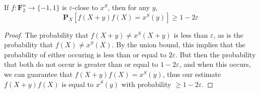 \begin{theorem}
    If $f: \mathbf{F}_2^n \to \{ -1, 1 \}$ is $\varepsilon$-close to $x^S$, then for any $y$,
    \[ \mathbf{P}_X[f(X + y)f(X) = x^S(y)] \geq 1 - 2 \varepsilon \]
\end{theorem}
\begin{proof}
    The probability that $f(X + y) \neq x^S(X + y)$ is less than $\varepsilon$, as is the probability that $f(X) \neq x^S(X)$. By the union bound, this implies that the probability of either occuring is less than or equal to $2\varepsilon$. But then the probability that both do not occur is greater than or equal to $1 - 2\varepsilon$, and when this occurs, we can guarantee that $f(X + y)f(X) = x^S(y)$, thus our estimate $f(X + y)f(X)$ is equal to $x^S(y)$ with probability $\geq 1 - 2 \varepsilon$.
\end{proof}

